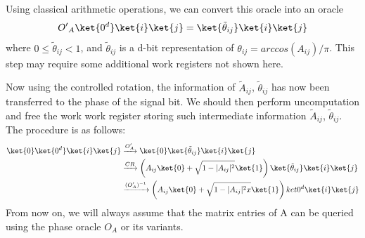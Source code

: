 \documentclass[12pt, oneside]{book}
\theoremstyle{definition}
\theoremstyle{definition}
\theoremstyle{remark}
\begin{document}
Using classical arithmetic operations, we can convert this oracle into an oracle
\[
{O'}_A\ket{0^d}\ket{i}\ket{j}=\ket{\tilde{\theta}_{ij}}\ket{i}\ket{j}
\]
where $0\leq \tilde{\theta}_{ij}<1$, and $\tilde{\theta}_{ij}$ is a d-bit representation of $\theta_{ij}=arccos(A_{ij})/\pi$. This step may require some additional work registers not shown here.

Now using the controlled rotation, the information of $\tilde{A}_{ij}$, $\tilde{\theta}_{ij}$ has now been transferred to the phase of the signal bit. We should then perform uncomputation and free the work work register storing such intermediate information $\tilde{A}_{ij}$, $\tilde{\theta}_{ij}$. The procedure is as follows:
\begin{align*}
\ket{0}\ket{0^d}\ket{i}\ket{j}&\xrightarrow{O'_A}\ket{0}\ket{\tilde{\theta}_{ij}}\ket{i}\ket{j}\\
&\xrightarrow{CR}\left(A_{ij}\ket{0}+\sqrt{1-|A_{ij}|^2}\ket{1}\right)\ket{\tilde{\theta}_{ij}}\ket{i}\ket{j}\\
&\xrightarrow{(O'_A)^{-1}}\left(A_{ij}\ket{0}+\sqrt{1-|A_{ij}|^2x}\ket{1}\right)ket{0^d}\ket{i}\ket{j}
\end{align*}
From now on, we will always assume that the matrix entries of A can be queried using the phase oracle $O_A$ or its variants.
\end{document}
